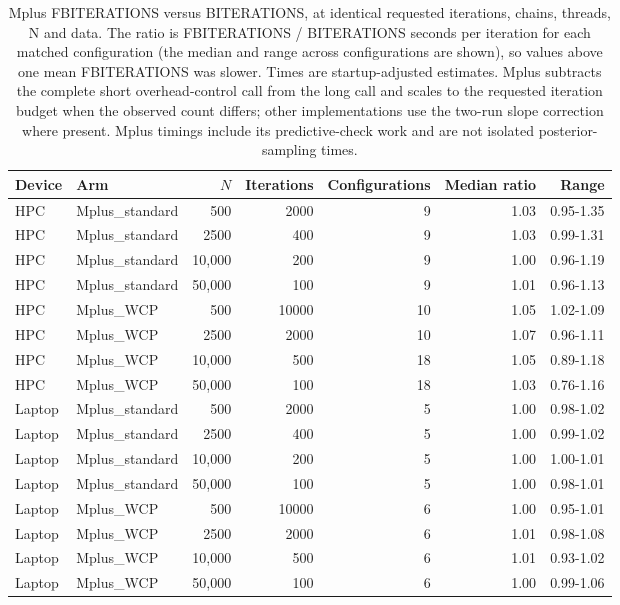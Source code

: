 \begin{table}[H]
\centering
\caption{Mplus FBITERATIONS versus BITERATIONS, at identical requested iterations, chains, threads, N and data. The ratio is FBITERATIONS / BITERATIONS seconds per iteration for each matched configuration (the median and range across configurations are shown), so values above one mean FBITERATIONS was slower. Times are startup-adjusted estimates. Mplus subtracts the complete short overhead-control call from the long call and scales to the requested iteration budget when the observed count differs; other implementations use the two-run slope correction where present. Mplus timings include its predictive-check work and are not isolated posterior-sampling times.}
\label{table:mplus_iteration_modes}
\begin{tabular}{llrrrrr}
\toprule
Device & Arm & $N$ & Iterations & Configurations & Median ratio & Range \\
\midrule
HPC & Mplus\_standard & 500 & 2000 & 9 & 1.03 & 0.95-1.35 \\
HPC & Mplus\_standard & 2500 & 400 & 9 & 1.03 & 0.99-1.31 \\
HPC & Mplus\_standard & 10,000 & 200 & 9 & 1.00 & 0.96-1.19 \\
HPC & Mplus\_standard & 50,000 & 100 & 9 & 1.01 & 0.96-1.13 \\
HPC & Mplus\_WCP & 500 & 10000 & 10 & 1.05 & 1.02-1.09 \\
HPC & Mplus\_WCP & 2500 & 2000 & 10 & 1.07 & 0.96-1.11 \\
HPC & Mplus\_WCP & 10,000 & 500 & 18 & 1.05 & 0.89-1.18 \\
HPC & Mplus\_WCP & 50,000 & 100 & 18 & 1.03 & 0.76-1.16 \\
Laptop & Mplus\_standard & 500 & 2000 & 5 & 1.00 & 0.98-1.02 \\
Laptop & Mplus\_standard & 2500 & 400 & 5 & 1.00 & 0.99-1.02 \\
Laptop & Mplus\_standard & 10,000 & 200 & 5 & 1.00 & 1.00-1.01 \\
Laptop & Mplus\_standard & 50,000 & 100 & 5 & 1.00 & 0.98-1.01 \\
Laptop & Mplus\_WCP & 500 & 10000 & 6 & 1.00 & 0.95-1.01 \\
Laptop & Mplus\_WCP & 2500 & 2000 & 6 & 1.01 & 0.98-1.08 \\
Laptop & Mplus\_WCP & 10,000 & 500 & 6 & 1.01 & 0.93-1.02 \\
Laptop & Mplus\_WCP & 50,000 & 100 & 6 & 1.00 & 0.99-1.06 \\
\bottomrule
\end{tabular}
\end{table}
